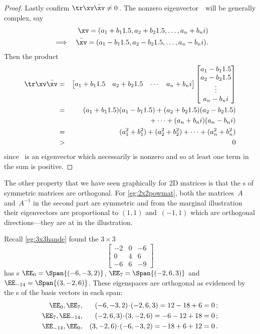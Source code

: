 \begin{proof}
Lastly confirm \(\tr\xv\bar\xv\neq0\)\,.  
The nonzero eigenvector~\xv\ will be generally complex, say 
\begin{eqnarray*}
&&\xv=(a_1+b_1\i,a_2+b_2\i,\ldots,a_n+b_ni)
\\&\implies&\bar\xv=(a_1-b_1\i,a_2-b_2\i,\ldots,a_n-b_ni).
\end{eqnarray*}
Then the product
\begin{eqnarray*}
\tr\xv\bar\xv&=&
\begin{bmatrix} a_1+b_1\i&a_2+b_2\i&\cdots&a_n+b_ni \end{bmatrix}
\begin{bmatrix} a_1-b_1\i\\a_2-b_2\i\\\vdots\\a_n-b_ni \end{bmatrix}
\\&=&(a_1+b_1\i)(a_1-b_1\i)+(a_2+b_2\i)(a_2-b_2\i)
\\&&{}+\cdots+(a_n+b_ni)(a_n-b_ni)
\\&=&(a_1^2+b_1^2)+(a_2^2+b_2^2)+\cdots+(a_n^2+b_n^2)
\\&>&0
\end{eqnarray*}
since \xv~is an eigenvector which necessarily is nonzero and so at least one term in the sum is positive.
\end{proof}


The other property that we have seen graphically for 2D matrices is that the s of symmetric matrices are orthogonal.
For \autoref{eg:2x2powmat}, both the matrices~\(A\) and~\(A^{-1}\) in 
the second part are symmetric and from the marginal illustration their eigenvectors are proportional to \((1,1)\) and~\((-1,1)\) which are orthogonal directions---they are at  in the illustration.

\begin{example} \label{eg:}
Recall \autoref{eg:3x3hande} found the \(3\times3\) 
\begin{equation*}
\begin{bmatrix} -2&0&-6\\0&4&6\\-6&6&-9 \end{bmatrix}
\end{equation*}
has s \(\EE_0=\Span\{(-6,-3,2)\}\), \(\EE_7=\Span\{(-2,6,3)\}\) and \(\EE_{-14}=\Span\{(3,-2,6)\}\).
These eigenspaces are orthogonal as evidenced by the s of the basis vectors in each span:
\begin{eqnarray*}
\EE_0,\EE_7,&&
(-6,-3,2)\cdot(-2,6,3)=12-18+6=0\,;
\\
\EE_7,\EE_{-14},&&
(-2,6,3)\cdot(3,-2,6)=-6-12+18=0\,;
\\
\EE_{-14},\EE_0,&&
(3,-2,6)\cdot(-6,-3,2)=-18+6+12=0\,.
\end{eqnarray*}
\end{example}





